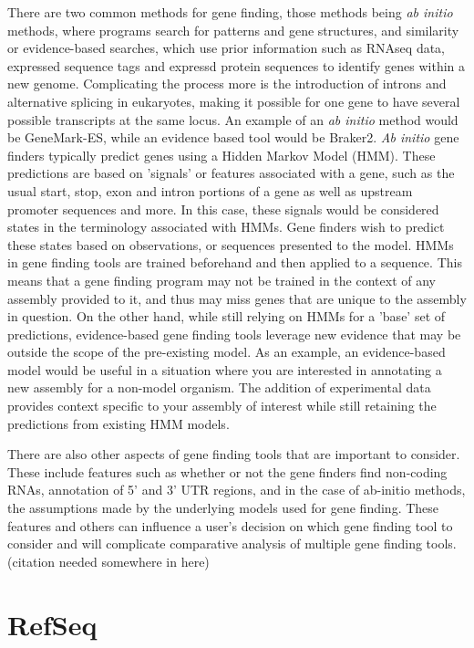 There are two common methods for gene finding, those methods being
\textit{ab initio} methods, where programs search for patterns and
gene structures, and similarity or evidence-based searches, which use
prior information such as RNAseq data, expressed sequence tags and
expressd protein sequences to identify genes within a new
genome\cite{Ejigu2020}. Complicating the process more is the
introduction of introns and alternative splicing in eukaryotes, making
it possible for one gene to have several possible transcripts at the
same locus. An example of an \textit{ab initio} method would be
GeneMark-ES\cite{10.1093/nar/gki937}, while an evidence based tool
would be Braker2\cite{Bruna2021}.
\textit{Ab initio} gene finders typically predict genes using a Hidden
Markov Model (HMM)\cite{Ejigu2020}. These predictions are based on
'signals' or features associated with a gene, such as the usual start,
stop, exon and intron portions of a gene as well as upstream promoter
sequences and more. In this case, these signals would be considered
states in the terminology associated with HMMs. Gene finders wish to
predict these states based on observations, or sequences presented to
the model. HMMs in gene finding tools are trained beforehand and then
applied to a sequence. This means that a gene finding program may not
be trained in the context of any assembly provided to it, and thus may
miss genes that are unique to the assembly in question.
On the other hand, while still relying on HMMs for a 'base' set of
predictions, evidence-based gene finding tools leverage new evidence
that may be outside the scope of the pre-existing
model\cite{Keller2011}.  As an example, an evidence-based model would
be useful in a situation where you are interested in annotating a new
assembly for a non-model organism. The addition of experimental data
provides context specific to your assembly of interest while still
retaining the predictions from existing HMM models.

There are also other aspects of gene finding tools that are important
to consider. These include features such as whether or not the gene
finders find non-coding RNAs, annotation of 5' and 3' UTR regions, and
in the case of ab-initio methods, the assumptions made by the
underlying models used for gene finding. These features and others can
influence a user's decision on which gene finding tool to consider and
will complicate comparative analysis of multiple gene finding
tools. (citation needed somewhere in here)

\section{RefSeq}

